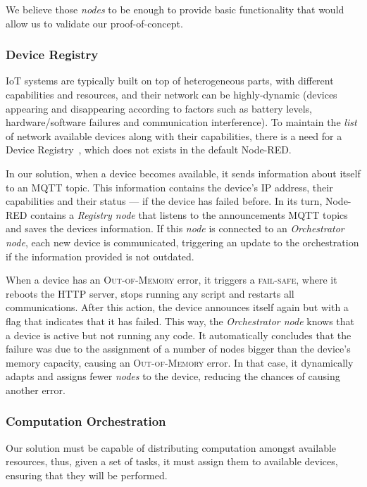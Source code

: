We believe those \textit{nodes} to be enough to provide basic functionality that would allow us to validate our proof-of-concept.

\subsubsection{Device Registry}
\label{sec:registry}

IoT systems are typically built on top of heterogeneous parts, with different capabilities and resources, and their network can be highly-dynamic (devices appearing and disappearing according to factors such as battery levels, hardware/software failures and communication interference). To maintain the \textit{list} of network available devices along with their capabilities, there is a need for a Device Registry~\cite{Ramadas17}, which does not exists in the default Node-RED.

In our solution, when a device becomes available, it sends information about itself to an MQTT topic. This information contains the device's IP address, their capabilities and their status --- if the device has failed before. In its turn, Node-RED contains a \textit{Registry node} that listens to the announcements MQTT topics and saves the devices information. If this \textit{node} is connected to an \textit{Orchestrator node}, each new device is communicated, triggering an update to the orchestration if the information provided is not outdated.

When a device has an \textsc{Out-of-Memory} error, it triggers a \textsc{fail-safe}, where it reboots the HTTP server, stops running any script and restarts all communications. After this action, the device announces itself again but with a flag that indicates that it has failed. This way, the \textit{Orchestrator node} knows that a device is active but not running any code. It automatically concludes that the failure was due to the assignment of a number of nodes bigger than the device's memory capacity, causing an \textsc{Out-of-Memory} error. In that case, it dynamically adapts and assigns fewer \textit{nodes} to the device, reducing the chances of causing another error.

\subsubsection{Computation Orchestration}\label{sec:node_red_computation_decentralization}

Our solution must be capable of distributing computation amongst available resources, thus, given a set of tasks, it must assign them to available devices, ensuring that they will be performed.


